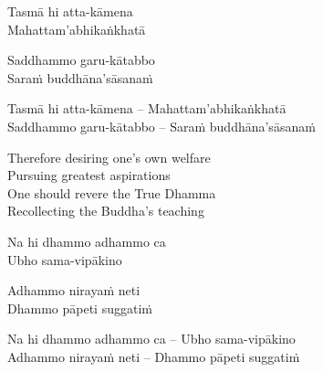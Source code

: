 \ifninebythirteen

\clearpage

\begin{pali-hang-verses}
  Tasmā hi atta-kāmena\\
  Mahattam'abhikaṅkhatā
\end{pali-hang-verses}
\begin{pali-hang-together}
  Saddhammo garu-kātabbo\\
  Saraṁ buddhāna'sāsanaṁ
\end{pali-hang-together}

\else

\begin{verses}
  Tasmā hi atta-kāmena – Mahattam'abhikaṅkhatā\\
  Saddhammo garu-kātabbo – Saraṁ buddhāna'sāsanaṁ
\end{verses}

\fi

\begin{english-verses}
  Therefore desiring one's own welfare\\
  Pursuing greatest aspirations\\
  One should revere the True Dhamma\\
  Recollecting the Buddha's teaching
\end{english-verses}

\ifninebythirteen\vspace{-0.5em}\fi

\suttaRef{[AN 4.21]}
\ifninebythirteen\vspace{0.5em}\fi

\ifbfive\clearpage\fi

\ifninebythirteen

\begin{pali-hang-verses}
  Na hi dhammo adhammo ca\\ 
  Ubho sama-vipākino
\end{pali-hang-verses}
\begin{pali-hang-together}
  Adhammo nirayaṁ neti\\
  Dhammo pāpeti suggatiṁ
\end{pali-hang-together}

\else

\begin{verses}
  Na hi dhammo adhammo ca – Ubho sama-vipākino\\
  Adhammo nirayaṁ neti – Dhammo pāpeti suggatiṁ
\end{verses}

\fi

